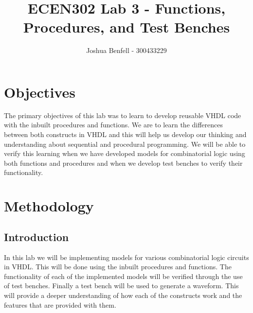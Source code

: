 \documentclass[a4paper, 12pt]{article}
\title{ECEN302 Lab 3 - Functions, Procedures, and Test Benches}
\author{Joshua Benfell - 300433229}
\begin{document}
	\maketitle
	
	\section{Objectives}
		The primary objectives of this lab was to learn to develop reusable VHDL code with the inbuilt procedures and functions. We are to learn the differences between both constructs in VHDL and this will help us develop our thinking and understanding about sequential and procedural programming. We will be able to verify this learning when we have developed models for combinatorial logic using both functions and procedures and when we develop test benches to verify their functionality.
	\section{Methodology}
		\subsection{Introduction}
			In this lab we will be implementing models for various combinatorial logic circuits in VHDL. This will be done using the inbuilt procedures and functions. The functionality of each of the implemented models will be verified through the use of test benches. Finally a test bench will be used to generate a waveform. This will provide a deeper understanding of how each of the constructs work and the features that are provided with them.
\end{document}
